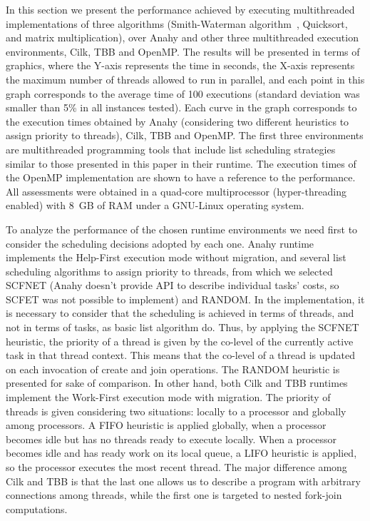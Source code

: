 \documentclass[twocolumn]{svjour3}
\begin{document}
{\color{blue}

In this section we present the performance achieved by executing multithreaded implementations of three algorithms (Smith-Waterman algorithm~\cite{smith-waterman}, Quicksort, and matrix multiplication), over Anahy and other three multithreaded execution environments, Cilk, TBB and OpenMP. The results will be presented in terms of graphics, where the Y-axis represents the time in seconds, the X-axis represents the maximum number of threads allowed to run in parallel, and each point in this graph corresponds to the average time of 100 executions (standard deviation was smaller than 5\% in all instances tested). Each curve in the graph corresponds to the execution times obtained by Anahy (considering two different heuristics to assign priority to threads), Cilk, TBB and OpenMP. The first three environments are multithreaded programming tools that include list scheduling strategies similar to those presented in this paper in their runtime. The execution times of the OpenMP implementation are shown to have a reference to the performance. All assessments were obtained in a quad-core multiprocessor (hyper-threading enabled) with 8~GB of RAM under a GNU-Linux operating system.

To analyze the performance of the chosen runtime environments we need first to consider the scheduling decisions adopted by each one. Anahy runtime implements the Help-First execution mode without migration, and several list scheduling algorithms to assign priority to threads, from which we selected SCFNET (Anahy doesn't provide API to describe individual tasks' costs, so SCFET was not possible to implement) and RANDOM. In the implementation, it is necessary to consider that the scheduling is achieved in terms of threads, and not in terms of tasks, as basic list algorithm do. Thus, by applying the SCFNET heuristic, the priority of a thread is given by the co-level of the currently active task in that thread context. This means that the co-level of a thread is updated on each invocation of create and join operations. The RANDOM heuristic is presented for sake of comparison. In other hand, both Cilk and TBB runtimes implement the Work-First execution mode with migration. The priority of threads is given considering two situations: locally to a processor and globally among processors. A FIFO heuristic is applied globally, when a processor becomes idle but has no threads ready to execute locally. When a processor becomes idle and has ready work on its local queue, a LIFO heuristic is applied, so the processor executes the most recent thread. The major difference among Cilk and TBB is that the last one allows us to describe a program with arbitrary connections among threads, while the first one is targeted to nested fork-join computations.

}
\end{document}
